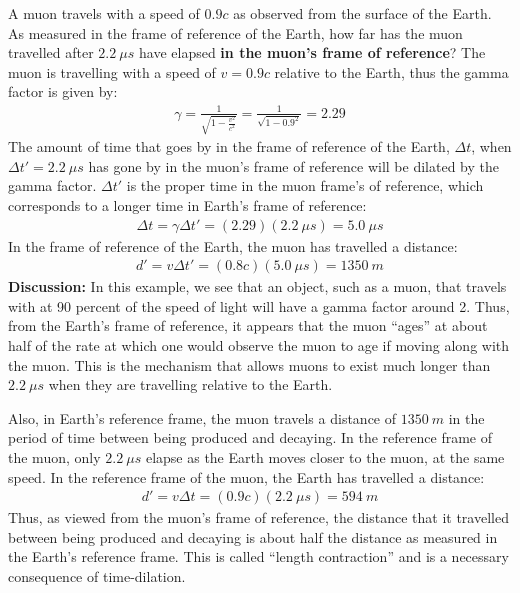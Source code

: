 \begin{example}{A muon travels with a speed of $0.9c$ as observed from the surface of the Earth. As measured in the frame of reference of the Earth, how far has the muon travelled after $\SI{2.2}{\mu s}$ have elapsed \textbf{in the muon's frame of reference}?}
The muon is travelling with a speed of $v=0.9c$ relative to the Earth, thus the gamma factor is given by:
\begin{align*}
\gamma = \frac{1}{\sqrt{1-\frac{v^2}{c^2}}} =\frac{1}{\sqrt{1-0.9^2}}=2.29
\end{align*}
The amount of time that goes by in the frame of reference of the Earth, $\Delta t$, when $\Delta t'=\SI{2.2}{\mu s}$ has gone by in the muon's frame of reference will be dilated by the gamma factor. $\Delta t'$ is the proper time in the muon frame's of reference, which corresponds to a longer time in Earth's frame of reference:
\begin{align*}
\Delta t = \gamma \Delta t' = (2.29)(\SI{2.2}{\mu s})=\SI{5.0}{\mu s}
\end{align*}
In the frame of reference of the Earth, the muon has travelled a distance:
\begin{align*}
d' = v\Delta t'=(0.8c)(\SI{5.0}{\mu s})=\SI{1350}{m}
\end{align*}
\textbf{Discussion: }In this example, we see that an object, such as a muon, that travels with at 90 percent of the speed of light will have a gamma factor around 2. Thus, from the Earth's frame of reference, it appears that the muon ``ages'' at about half of the rate at which one would observe the muon to age if moving along with the muon. This is the mechanism that allows muons to exist much longer than $\SI{2.2}{\mu s}$ when they are travelling relative to the Earth.

Also, in Earth's reference frame, the muon travels a distance of $\SI{1350}{m}$ in the period of time between being produced and decaying. In the reference frame of the muon, only $\SI{2.2}{\mu s}$ elapse as the Earth moves closer to the muon, at the same speed. In the reference frame of the muon, the Earth has travelled a distance:
\begin{align*}
d' = v\Delta t=(0.9c)(\SI{2.2}{\mu s})=\SI{594}{m}
\end{align*}
Thus, as viewed from the muon's frame of reference, the distance that it travelled between being produced and decaying is about half the distance as measured in the Earth's reference frame. This is called ``length contraction'' and is a necessary consequence of time-dilation. 
\end{example}
